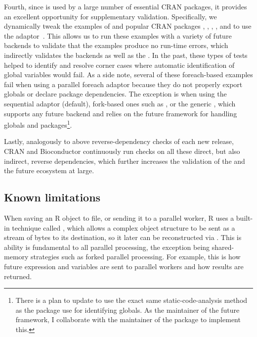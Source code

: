 Fourth, since  is used by a large number of essential
CRAN packages, it provides an excellent opportunity for supplementary
validation. Specifically, we dynamically tweak the examples of
 and popular CRAN packages ,
, , , and  to use
the  adaptor~\citep{CRAN:doFuture}.  This allows us
to run these examples with a variety of future backends to validate
that the examples produce no run-time errors, which indirectly
validates the backends as well as the .  In the past,
these types of tests helped to identify and resolve corner cases where
automatic identification of global variables would fail.  As a side
note, several of these foreach-based examples fail when using a
parallel foreach adaptor because they do not properly export globals
or declare package dependencies.  The exception is when using the
sequential
 adaptor (default), fork-based ones such as , or
the generic , which supports any future backend and
relies on the future framework for handling globals and
packages\footnote{There is a plan to update  to use the
exact same static-code-analysis method as the  package use
for identifying globals.  As the maintainer of the future framework, I
collaborate with the maintainer of the  package to
implement this.}.

Lastly, analogously to above reverse-dependency checks of each new
release, CRAN and Bioconductor continuously run checks on all these
direct, but also indirect, reverse dependencies, which further
increases the validation of the  and the future
ecosystem at large.


\subsection{Known limitations}
\label{known-limitations}

When saving an R object to file, or sending it to a parallel worker, R
uses a built-in technique called , which allows a
complex object structure to be sent as a stream of bytes to its
destination, so it later can be reconstructed
via .  This is ability is fundamental to all
parallel processing, the exception being shared-memory strategies such
as forked parallel processing.  For example, this is how future
expression and variables are sent to parallel workers and how results
are returned.


